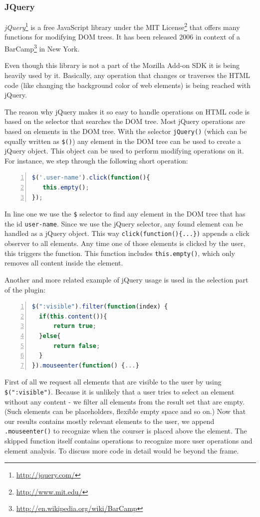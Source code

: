 \subsubsection*{JQuery}
\emph{jQuery}\footnote{\url{http://jquery.com/}} is a free JavaScript library under the MIT License\footnote{\url{http://www.mit.edu/}} that offers many functions for modifying DOM trees. It has been released 2006 in context of a BarCamp\footnote{\url{http://en.wikipedia.org/wiki/BarCamp}} in New York.

Even though this library is not a part of the Mozilla Add-on SDK it is being heavily used by it. Basically, any operation that changes or traverses the HTML code (like changing the background color of web elements) is being reached with jQuery.

The reason why jQuery makes it so easy to handle operations on HTML code is based on the selector that searches the DOM tree. Most jQuery operations are based on elements in the DOM tree. With the selector \verb+jQuery()+ (which can be equally written as \verb+$()+) any element in the DOM tree can be used to create a jQuery object. This object can be used to perform modifying operations on it. For instance, we step through the following short operation:
\begin{lstlisting}[language=JavaScript, numbers=left]
$('.user-name').click(function(){
   this.empty();
});
\end{lstlisting}

In line one we use the \verb+$+ selector to find any element in the DOM tree that has the id \verb+user-name+. Since we use the jQuery selector, any found element can be handled as a jQuery object. This way \verb+click(function(){...})+ appends a click observer to all elements. Any time one of those elements is clicked by the user, this triggers the function. This function includes \verb+this.empty()+, which only removes all content inside the element. 

Another and more related example of jQuery usage is used in the selection part of the plugin:
\begin{lstlisting}[language=JavaScript, numbers=left]
$(":visible").filter(function(index) {
  if(this.content()){
      return true;
  }else{
      return false;
  }
}).mouseenter(function() {...}
\end{lstlisting} 

First of all we request all elements that are visible to the user by using \verb+$(":visible")+. Because it is unlikely that a user tries to select an element without any content - we filter all elements from the result set that are empty. (Such elements can be placeholders, flexible empty space and so on.) Now that our results contains mostly relevant elements to the user, we append \verb+.mouseenter()+ to recognize when the courser is placed above the element. The skipped function itself contains operations to recognize more user operations and element analysis. To discuss more code in detail would be beyond the frame. 

